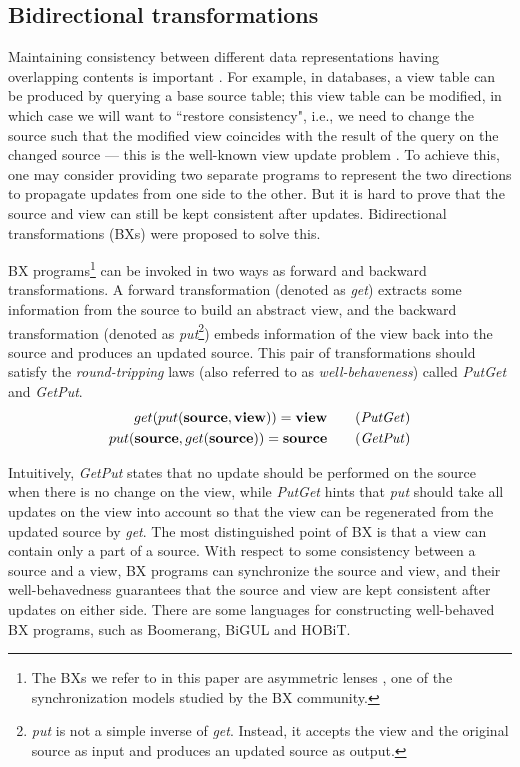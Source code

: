 \documentclass[conference]{IEEEtran}
\begin{document}
    \subsection{Bidirectional transformations}
    Maintaining consistency between different data representations having overlapping contents is important \cite{abou2018introduction}. For example, in databases, a view table can be produced by querying a base source table; this view table can be modified, in which case we will want to ``restore consistency", i.e.,  we need to change the source such that the modified view coincides with the result of the query on the changed source --- this is the well-known view update problem \cite{bancilhon1981update}. To achieve this, one may consider providing two separate programs to represent the two directions to propagate updates from one side to the other. But it is hard to prove that the source and view can still be kept consistent after updates. Bidirectional transformations (BXs) were proposed  \cite{czarnecki2009bidirectional} to solve this.
    
    BX programs\footnote{The BXs we refer to in this paper are asymmetric lenses \cite{foster2007combinators}, one of the synchronization models studied by the BX community. } can be invoked in two ways as forward and backward transformations. A forward transformation (denoted as \emph{get}) extracts some information from the source to build an abstract view, and the backward transformation (denoted as \emph{put}\footnote{\emph{put} is not a simple inverse of \emph{get}. Instead, it accepts the view and the original source as input and produces an updated source as output.}) embeds information of the view back into the source and produces an updated source. This pair of transformations should satisfy the {\em round-tripping} laws (also referred to as {\em well-behaveness}) called \emph{PutGet} and \emph{GetPut}. 
    \begin{align}
    get (put(\textbf{source}, \textbf{view}))= \textbf{view} \tag {\emph{PutGet}} \\
    put (\textbf{source}, get (\textbf{source})) = \textbf{source} \tag {\emph{GetPut}} 
    \end{align}
    
    Intuitively, \emph{GetPut} states that no update should be performed on the source when there is no change on the view, while \emph{PutGet} hints that \emph{put} should take all updates on the view into account so that the view can be regenerated from the updated source by \emph{get}. 
    The most distinguished point of BX is that a view can contain only a part of a source. With respect to some consistency between a source and a view, BX programs can synchronize the source and view, and their well-behavedness guarantees that the source and view are kept consistent after updates on either side. There are some languages for constructing well-behaved BX programs, such as Boomerang\cite{bohannon2008boomerang}, BiGUL \cite{bigul} and HOBiT\cite{matsuda2018hobit}.
    
\end{document}
